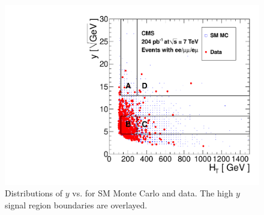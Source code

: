 \begin{figure}[tbh]
\begin{center}
\includegraphics[width=0.7\linewidth]{plots/abcd_204pb_highy.pdf}
\caption{\label{fig:abcdData2}\protect Distributions of $y$ 
vs. \Ht for SM Monte Carlo and data. The high $y$ signal region boundaries are overlayed.}
\end{center}
\end{figure}


